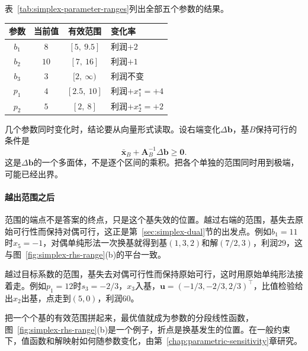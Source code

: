 表~\ref{tab:simplex-parameter-ranges}列出全部五个参数的结果。

\begin{BookInlineTable}
 \centering
 \begin{tabular}{cccl}
  \toprule
  参数 & 当前值 & 有效范围 & 变化率\\
  \midrule
  $b_1$ & $8$ & $[5,\ 9.5]$ & 利润$+2$\\
  $b_2$ & $10$ & $[7,\ 16]$ & 利润$+1$\\
  $b_3$ & $3$ & $[2,\ \infty)$ & 利润不变\\
  $p_1$ & $4$ & $[2.5,\ 10]$ & 利润$+x_1^\star=+4$\\
  $p_2$ & $5$ & $[2,\ 8]$ & 利润$+x_2^\star=+2$\\
  \bottomrule
 \end{tabular}
 \caption{单个参数变化时最优基$(1,5,2)$的有效范围，变化率指参数每增加一单位时最优利润的变化，只在范围内有效。}
 \label{tab:simplex-parameter-ranges}
\end{BookInlineTable}

几个参数同时变化时，结论要从向量形式读取。设右端变化$\Delta\bm{b}$，基$B$保持可行的条件是
\[
 \bar{\bm{x}}_B+\bm{A}_B^{-1}\Delta\bm{b}\geq\bm{0}.
\]
这是$\Delta\bm{b}$的一个多面体，不是逐个区间的乘积。把各个单独的范围同时用到极端，可能已经出界。

\paragraph{越出范围之后}
范围的端点不是答案的终点，只是这个基失效的位置。越过右端的范围，基失去原始可行性而保持对偶可行，这正是第~\ref{sec:simplex-dual}节的出发点。例如$b_1=11$时$x_5=-1$，对偶单纯形法一次换基就得到基$(1,3,2)$和解$(7/2,3)$，利润$29$，这与图~\ref{fig:simplex-rhs-range}(b)的平台一致。

越过目标系数的范围，基失去对偶可行性而保持原始可行，这时用原始单纯形法接着走。例如$p_1=12$时$s_3=-2/3$，$x_3$入基，$\bm{u}=(-1/3,-2/3,2/3)^\top$，比值检验给出$x_2$出基，点走到$(5,0)$，利润$60$。

把一个个基的有效范围拼起来，最优值就成为参数的分段线性函数，图~\ref{fig:simplex-rhs-range}(b)是一个例子，折点是换基发生的位置。在一般约束下，值函数和解映射如何随参数变化，由第~\ref{chap:parametric-sensitivity}章研究。
